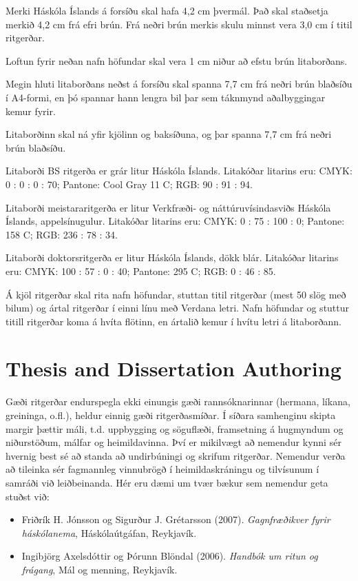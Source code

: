 \documentclass[a4paper,12pt,twoside,BCOR=10mm]{scrbook}
\begin{document}
Merki Háskóla Íslands á forsíðu skal hafa 4,2 cm þvermál. Það skal staðsetja merkið 4,2 cm frá efri brún. Frá neðri brún merkis skulu minnst vera 3,0 cm í titil ritgerðar.

Loftun fyrir neðan nafn höfundar skal vera 1 cm niður að efstu brún litaborðans.

Megin hluti litaborðans neðst á forsíðu skal spanna 7,7 cm frá neðri brún blaðsíðu í A4-formi, en þó spannar hann lengra bil þar sem táknmynd aðalbyggingar kemur fyrir.

Litaborðinn skal ná yfir kjölinn og baksíðuna, og þar spanna 7,7 cm frá neðri brún blaðsíðu.

Litaborði BS ritgerða er grár litur Háskóla Íslands. Litakóðar litarins eru: CMYK: 0 : 0 : 0 : 70; Pantone: Cool Gray 11 C; RGB: 90 : 91 : 94.

Litaborði meistararitgerða er litur Verkfræði- og náttúruvísindasviðs Háskóla Íslands, appelsínugulur. Litakóðar litarins eru: CMYK:  0 : 75 : 100 : 0; Pantone: 158 C; RGB: 236 : 78 : 34.

Litaborði doktorsritgerða er litur Háskóla Íslands, dökk blár. Litakóðar litarins eru: CMYK: 100 : 57 : 0 : 40; Pantone: 295 C; RGB: 0 : 46 : 85.

Á kjöl ritgerðar skal rita nafn höfundar, stuttan titil ritgerðar (mest 50 slög með bilum) og ártal ritgerðar í einni línu með Verdana letri. Nafn höfundar og stuttur titill ritgerðar koma á hvíta flötinn, en ártalið kemur í hvítu letri á litaborðann.

\section{Thesis and Dissertation Authoring}
Gæði ritgerðar endurspegla ekki einungis gæði rannsóknarinnar (hermana, líkana, greininga, o.fl.), heldur einnig gæði ritgerðasmíðar. Í síðara samhenginu skipta margir þættir máli, t.d. uppbygging og söguflæði, framsetning á hugmyndum og niðurstöðum, málfar og heimildavinna. Því er mikilvægt að nemendur kynni sér hvernig best sé að standa að undirbúningi og skrifum ritgerðar. Nemendur verða að tileinka sér fagmannleg vinnubrögð í heimildaskráningu og tilvísunum í samráði við leiðbeinanda. Hér eru dæmi um tvær bækur sem nemendur geta stuðst við:
\begin{itemize}
 \item Friðrík H. Jónsson og Sigurður J. Grétarsson (2007). \textit{Gagnfræðikver fyrir háskólanema}, Háskólaútgáfan, Reykjavík.
 \item Ingibjörg Axelsdóttir og Þórunn Blöndal (2006).  \textit{Handbók um ritun og frágang},  Mál og menning, Reykjavík.
\end{itemize}
\end{document}

